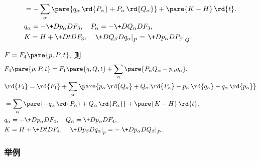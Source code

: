 \documentclass[../LectureNotes.tex]{subfiles}
\begin{document}
\begin{cenum}
\begin{align*}
        & = -\sum_\alpha \pare{q_\alpha\,\rd{P_\alpha} + P_\alpha\,\rd{Q_\alpha}} + \pare{K-H}\,\rd{t}. \\
        & q_\alpha = -\+D{p_\alpha}D{F_3},\quad P_\alpha = -\+D{Q_\alpha}D{F_3}, \\
        & K = H + \+DtD{F_3},\quad \left.\+D{Q_\beta}D{q_\alpha}\right\vert_P = \left.\+D{p_\alpha}D{P_\beta}\right\vert_Q.
    \end{align*}
    \item $F=F_4\pare{p,P,t}$, 则
    \begin{align*}
        & F_4\pare{p,P,t} = F_1\pare{q,Q,t} + \sum_\alpha\pare{P_\alpha Q_\alpha - p_\alpha q_\alpha}, \\
        & \rd{F_4} = \rd{F_1} + \sum_\alpha\pare{p_\alpha\,\rd{Q_\alpha} + Q_\alpha\,\rd{P_\alpha} - p_\alpha\,\rd{q_\alpha} - q_\alpha\,\rd{p_\alpha}} \\
        & = \sum_\alpha\pare{-q_\alpha\,\rd{P_\alpha}+ Q_\alpha\,\rd{P_\alpha}} + \pare{K-H}\,\rd{t}. \\
        & q_\alpha = -\+D{p_\alpha}D{F_4},\quad Q_\alpha = \+D{p_\alpha}D{F_4},\\
        & K = H + \+DtD{F_4},\quad \left.\+D{p_\beta}D{q_\alpha}\right\vert_p = -\left.\+D{p_\alpha}D{Q_\beta}\right\vert_P.
    \end{align*}
\end{cenum}


\subsubsection{举例} %
\label{ssub:举例}
\end{document}
